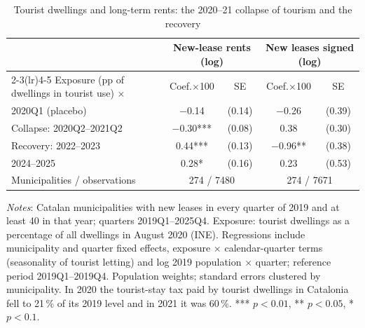 \begin{table}[!htbp]\centering\small
\caption{Tourist dwellings and long-term rents: the 2020--21 collapse of tourism and the recovery}\label{tab:tourism}
\begin{tabular}{lcccc}\toprule
 & \multicolumn{2}{c}{New-lease rents (log)} & \multicolumn{2}{c}{New leases signed (log)}\\\cmidrule(lr){2-3}\cmidrule(lr){4-5}
Exposure (pp of dwellings in tourist use) $\times$ & Coef.$\times$100 & SE & Coef.$\times$100 & SE\\\midrule
2020Q1 (placebo) & $-$0.14 & (0.14) & $-$0.26 & (0.39)\\
Collapse: 2020Q2--2021Q2 & $-$0.30*** & (0.08) & 0.38 & (0.30)\\
Recovery: 2022--2023 & 0.44*** & (0.13) & $-$0.96** & (0.38)\\
2024--2025 & 0.28* & (0.16) & 0.23 & (0.53)\\
Municipalities / observations & \multicolumn{2}{c}{274 / 7480} & \multicolumn{2}{c}{274 / 7671}\\
\bottomrule\end{tabular}
\begin{minipage}{0.92\linewidth}\footnotesize\vspace{4pt}
\textit{Notes}: Catalan municipalities with new leases in every quarter of 2019 and at least 40 in that year; quarters 2019Q1--2025Q4. Exposure: tourist dwellings as a percentage of all dwellings in August 2020 (INE). Regressions include municipality and quarter fixed effects, exposure $\times$ calendar-quarter terms (seasonality of tourist letting) and log 2019 population $\times$ quarter; reference period 2019Q1--2019Q4. Population weights; standard errors clustered by municipality. In 2020 the tourist-stay tax paid by tourist dwellings in Catalonia fell to 21\,\% of its 2019 level and in 2021 it was 60\,\%. *** $p<0.01$, ** $p<0.05$, * $p<0.1$.
\end{minipage}\end{table}
